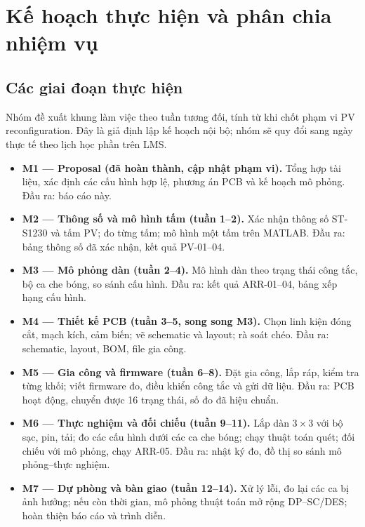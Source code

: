 \section{Kế hoạch thực hiện và phân chia nhiệm vụ}
\label{sec:plan}

\subsection{Các giai đoạn thực hiện}

Nhóm đề xuất khung làm việc theo tuần tương đối, tính từ khi chốt phạm vi PV reconfiguration. Đây là giả định lập kế hoạch nội bộ; nhóm sẽ quy đổi sang ngày thực tế theo lịch học phần trên LMS.

\begin{itemize}
    \item \textbf{M1 --- Proposal (đã hoàn thành, cập nhật phạm vi).} Tổng hợp tài liệu, xác định các cấu hình hợp lệ, phương án PCB và kế hoạch mô phỏng. Đầu ra: báo cáo này.
    \item \textbf{M2 --- Thông số và mô hình tấm (tuần 1--2).} Xác nhận thông số ST-S1230 và tấm PV; đo từng tấm; mô hình một tấm trên MATLAB. Đầu ra: bảng thông số đã xác nhận, kết quả PV-01--04.
    \item \textbf{M3 --- Mô phỏng dàn (tuần 2--4).} Mô hình dàn theo trạng thái công tắc, bộ ca che bóng, so sánh cấu hình. Đầu ra: kết quả ARR-01--04, bảng xếp hạng cấu hình.
    \item \textbf{M4 --- Thiết kế PCB (tuần 3--5, song song M3).} Chọn linh kiện đóng cắt, mạch kích, cảm biến; vẽ schematic và layout; rà soát chéo. Đầu ra: schematic, layout, BOM, file gia công.
    \item \textbf{M5 --- Gia công và firmware (tuần 6--8).} Đặt gia công, lắp ráp, kiểm tra từng khối; viết firmware đo, điều khiển công tắc và gửi dữ liệu. Đầu ra: PCB hoạt động, chuyển được 16 trạng thái, số đo đã hiệu chuẩn.
    \item \textbf{M6 --- Thực nghiệm và đối chiếu (tuần 9--11).} Lắp dàn \(3\times3\) với bộ sạc, pin, tải; đo các cấu hình dưới các ca che bóng; chạy thuật toán quét; đối chiếu với mô phỏng, chạy ARR-05. Đầu ra: nhật ký đo, đồ thị so sánh mô phỏng--thực nghiệm.
    \item \textbf{M7 --- Dự phòng và bàn giao (tuần 12--14).} Xử lý lỗi, đo lại các ca bị ảnh hưởng; nếu còn thời gian, mô phỏng thuật toán mở rộng DP--SC/DES; hoàn thiện báo cáo và trình diễn.
\end{itemize}


